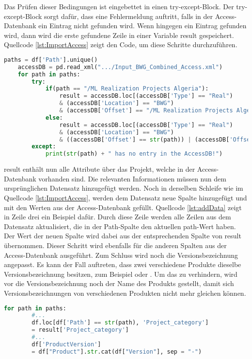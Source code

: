 Das Prüfen dieser Bedingungen ist eingebettet in einen try-except-Block. Der try-except-Block sorgt dafür, dass eine Fehlermeldung auftritt, falls in der Access-Datenbank ein Eintrag nicht gefunden wird.
Wenn hingegen ein Eintrag gefunden wird, dann wird die erste gefundene Zeile in einer Variable \glqq result\grqq{} gespeichert. Quellcode \ref*{lst:ImportAccess} zeigt den Code, um diese Schritte durchzuführen.
\begin{lstlisting}[language = python, caption={Importieren der Access-Datenbank},captionpos=b, label = lst:ImportAccess, floatplacement=H]
    paths = df['Path'].unique()
    accessDB = pd.read_xml(".../Input_BWG_Combined_Access.xml")
    for path in paths:
        try:
            if(path == "/ML Realization Projects Algeria"):
                result = accessDB.loc[(accessDB['Type'] == "Real") 
                & (accessDB['Location'] == "BWG") 
                & (accessDB['Offset'] == "/ML Realization Projects Algeria/20006_ML_BM_Boughezoul_MSila")].iloc[0]
            else:
                result = accessDB.loc[(accessDB['Type'] == "Real") 
                & (accessDB['Location'] == "BWG") 
                & ((accessDB['Offset'] == str(path)) | (accessDB['Offset'] == (str(path) + "/")))].iloc[0]           
        except:
            print(str(path) + " has no entry in the AccessDB!")
\end{lstlisting}
\glqq result\grqq{} enthält nun alle Attribute über das Projekt, welche in der Access-Datenbank vorhanden sind. Die relevanten Informationen müssen nun dem ursprünglichen 
Datensatz hinzugefügt werden. Noch in derselben Schleife wie im Quellcode \ref*{lst:ImportAccess}, werden dem Datensatz neue Spalte hinzugefügt und mit den Werten aus der 
Access-Datenbank gefüllt. Quellcode \ref*{lst:addData} zeigt in Zeile drei ein Beispiel dafür. Durch diese Zeile werden alle Zeilen aus dem Datensatz aktualisiert, 
die in der \glqq Path\grqq{}-Spalte den aktuellen \glqq path\grqq{}-Wert haben. Der Wert der neuen Spalte wird dabei aus der entsprechenden Spalte von \glqq result\grqq{} übernommen.
Dieser Schritt wird ebenfalls für die anderen Spalten aus der Access-Datenbank ausgeführt. Zum Schluss wird noch die Versionsbezeichnung angepasst. 
Es kann der Fall auftreten, dass zwei verschiedene Produkte dieselbe Versionsbezeichnung besitzen, zum Beispiel \grqq{} oder \grqq{}. Um das zu verhindern,
wird vor die Versionsbezeichnung noch der Name des Produkts gestellt, damit sich Versionsbezeichnungen von verschiedenen Produkten nicht mehr gleichen können.
\begin{lstlisting}[language = python, caption={Erweiterung des Datensatzes},captionpos=b, label = lst:addData, floatplacement=H]
    for path in paths:
        #...
        df.loc[df['Path'] == str(path), 'Project_category']
        = result['Project_category']
        #...
        df['ProductVersion'] 
        = df["Product"].str.cat(df["Version"], sep = "-")
\end{lstlisting}
